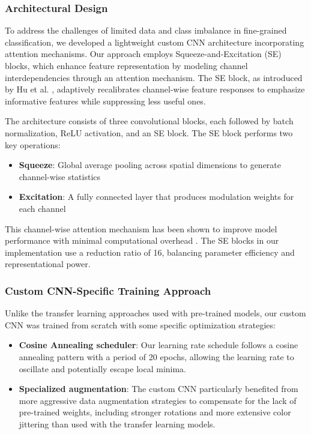 \documentclass[a4paper,12pt]{report}
\begin{document}
\subsubsection{Architectural Design}

To address the challenges of limited data and class imbalance in fine-grained classification, we developed a lightweight custom CNN architecture incorporating attention mechanisms. Our approach employs Squeeze-and-Excitation (SE) blocks, which enhance feature representation by modeling channel interdependencies through an attention mechanism. The SE block, as introduced by Hu et al. \citep{Hu_2018_CVPR}, adaptively recalibrates channel-wise feature responses to emphasize informative features while suppressing less useful ones.

The architecture consists of three convolutional blocks, each followed by batch normalization, ReLU activation, and an SE block. The SE block performs two key operations:
\begin{itemize}
    \item \textbf{Squeeze}: Global average pooling across spatial dimensions to generate channel-wise statistics
    \item \textbf{Excitation}: A fully connected layer that produces modulation weights for each channel
\end{itemize}

This channel-wise attention mechanism has been shown to improve model performance with minimal computational overhead \citep{Hu_2018_CVPR}. The SE blocks in our implementation use a reduction ratio of 16, balancing parameter efficiency and representational power.

\subsubsection{Custom CNN-Specific Training Approach}

Unlike the transfer learning approaches used with pre-trained models, our custom CNN was trained from scratch with some specific optimization strategies:

\begin{itemize}
    \item \textbf{Cosine Annealing scheduler}: Our learning rate schedule follows a cosine annealing pattern with a period of 20 epochs, allowing the learning rate to oscillate and potentially escape local minima.
    
    
    \item \textbf{Specialized augmentation}: The custom CNN particularly benefited from more aggressive data augmentation strategies to compensate for the lack of pre-trained weights, including stronger rotations and more extensive color jittering than used with the transfer learning models.
\end{itemize}
\end{document}
